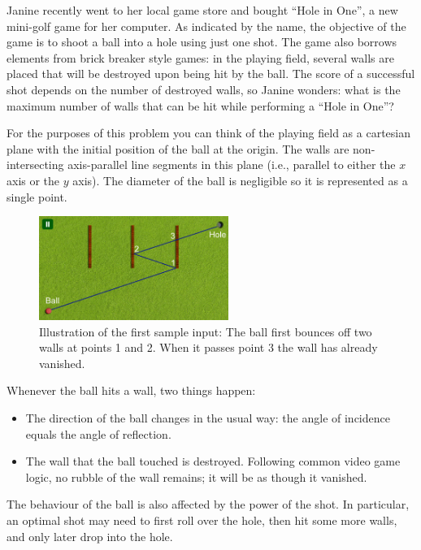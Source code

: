 
Janine recently went to her local game store and bought ``Hole in One'', a new mini-golf game for her computer. As indicated by the name, the objective of the game is to shoot a ball into a hole using just one shot. The game also borrows elements from brick breaker style games: in the playing field, several walls are placed that will be destroyed upon being hit by the ball.  The score of a successful shot depends on the number of destroyed walls, so Janine wonders: what is the maximum number of walls that can be hit while performing a ``Hole in One''?

For the purposes of this problem you can think of the playing field as a cartesian plane with the initial position of the ball at the origin. The walls are non-intersecting axis-parallel line segments in this plane (i.e., parallel to either the $x$ axis or the $y$ axis).  The diameter of the ball is negligible so it is represented as a single point.
\begin{figure}[h!]
	\centering
	\includegraphics[width=0.55\textwidth]{sample-illustration-new.png}
	\begin{minipage}[c]{0.82\textwidth}
		\caption{Illustration of the first sample input: The ball first bounces off two walls
		at points 1 and 2. When it passes point 3 the wall has already vanished.}
	\end{minipage}
\end{figure}

Whenever the ball hits a wall, two things happen:
\begin{itemize}
\item The direction of the ball changes in the usual way: the angle of incidence equals the angle of reflection.
\item The wall that the ball touched is destroyed. Following common video game logic, no rubble of the wall remains; it will be as though it vanished.
\end{itemize}

The behaviour of the ball is also affected by the power of the
shot.  In particular, an optimal shot may need to first roll over the
hole, then hit some more walls, and only later drop into the hole.

